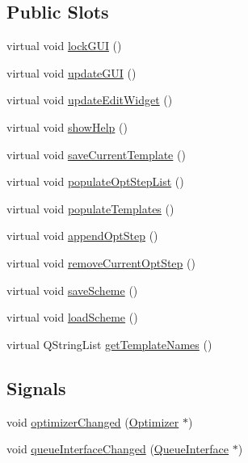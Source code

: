 \subsection*{Public Slots}
\begin{DoxyCompactItemize}
\item 
virtual void \hyperlink{classGlobalSearch_1_1AbstractEditTab_a450c63567ac48b329469b2c380ff46a4}{lock\-G\-U\-I} ()
\item 
virtual void \hyperlink{classGlobalSearch_1_1AbstractEditTab_ae34c4af22aa9a04eebc3a4a4a284da53}{update\-G\-U\-I} ()
\item 
virtual void \hyperlink{classGlobalSearch_1_1AbstractEditTab_a19292ce55de31e989deee2b166c188d1}{update\-Edit\-Widget} ()
\item 
virtual void \hyperlink{classGlobalSearch_1_1AbstractEditTab_a19d5d4e568a67e46cc6431ba8c4199d0}{show\-Help} ()
\item 
virtual void \hyperlink{classGlobalSearch_1_1AbstractEditTab_a27965a0c57832b480b6663e786950e7d}{save\-Current\-Template} ()
\item 
virtual void \hyperlink{classGlobalSearch_1_1AbstractEditTab_ac973d18ed4a3c2d4ed8392a1fc8bed10}{populate\-Opt\-Step\-List} ()
\item 
virtual void \hyperlink{classGlobalSearch_1_1AbstractEditTab_ae37c49f896c0d668d48ef9bcae90dcf7}{populate\-Templates} ()
\item 
virtual void \hyperlink{classGlobalSearch_1_1AbstractEditTab_ae86997d35f9d05458638766b4378b92d}{append\-Opt\-Step} ()
\item 
virtual void \hyperlink{classGlobalSearch_1_1AbstractEditTab_a5507b5aaa5021085a57d1be72b71d975}{remove\-Current\-Opt\-Step} ()
\item 
virtual void \hyperlink{classGlobalSearch_1_1AbstractEditTab_a5ff01d9316ca927b7cf75d7a6720a793}{save\-Scheme} ()
\item 
virtual void \hyperlink{classGlobalSearch_1_1AbstractEditTab_a0b0d6a412e3b73113a0e84f6a86c0a8c}{load\-Scheme} ()
\item 
virtual Q\-String\-List \hyperlink{classGlobalSearch_1_1AbstractEditTab_a78c72c6174761b4c95eb4d512042120c}{get\-Template\-Names} ()
\end{DoxyCompactItemize}
\subsection*{Signals}
\begin{DoxyCompactItemize}
\item 
void \hyperlink{classGlobalSearch_1_1AbstractEditTab_a439d2f12f3121c30adf8f3375b631dee}{optimizer\-Changed} (\hyperlink{classGlobalSearch_1_1Optimizer}{Optimizer} $\ast$)
\item 
void \hyperlink{classGlobalSearch_1_1AbstractEditTab_a069c8370545d5fbde59b7634ba6bb621}{queue\-Interface\-Changed} (\hyperlink{classGlobalSearch_1_1QueueInterface}{Queue\-Interface} $\ast$)
\end{DoxyCompactItemize}
